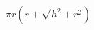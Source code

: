 \documentclass[preview]{standalone}
\begin{document}
\begin{align*}
\pi r (r + \sqrt{h^2 + r^2})
\end{align*}
\end{document}

